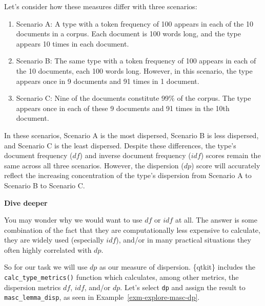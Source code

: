 \documentclass[
  letterpaper,
  krantz1]{latex/krantz-mod}
\providecommand{\tightlist}{%
  \setlength{\itemsep}{0pt}\setlength{\parskip}{0pt}}\usepackage{longtable,booktabs,array}
\theoremstyle{definition}
\theoremstyle{definition}
\theoremstyle{remark}
\begin{document}
\pagebreak

Let's consider how these measures differ with three scenarios:

\begin{enumerate}
\def\labelenumi{\arabic{enumi}.}
\tightlist
\item
  Scenario A: A type with a token frequency of 100 appears in each of
  the 10 documents in a corpus. Each document is 100 words long, and the
  type appears 10 times in each document.
\item
  Scenario B: The same type with a token frequency of 100 appears in
  each of the 10 documents, each 100 words long. However, in this
  scenario, the type appears once in 9 documents and 91 times in 1
  document.
\item
  Scenario C: Nine of the documents constitute 99\% of the corpus. The
  type appears once in each of these 9 documents and 91 times in the
  10th document.
\end{enumerate}

In these scenarios, Scenario A is the most dispersed, Scenario B is less
dispersed, and Scenario C is the least dispersed. Despite these
differences, the type's document frequency (\(df\)) and inverse document
frequency (\(idf\)) scores remain the same across all three scenarios.
However, the dispersion (\(dp\)) score will accurately reflect the
increasing concentration of the type's dispersion from Scenario A to
Scenario B to Scenario C.

\begin{tcolorbox}[enhanced jigsaw, toprule=.15mm, breakable, colback=white, arc=.35mm, left=2mm, colframe=quarto-callout-color-frame, opacityback=0, bottomrule=.15mm, rightrule=.15mm, leftrule=.75mm]

\textbf{ Dive deeper}

You may wonder why we would want to use \(df\) or \(idf\) at all. The
answer is some combination of the fact that they are computationally
less expensive to calculate, they are widely used (especially \(idf\)),
and/or in many practical situations they often highly correlated with
\(dp\).

\end{tcolorbox}

So for our task we will use \(dp\) as our measure of
dispersion. \{qtkit\} includes the
\texttt{calc\_type\_metrics()} function which calculates, among other
metrics, the dispersion metrics \(df\), \(idf\), and/or \(dp\). Let's
select \texttt{dp} and assign the result to \texttt{masc\_lemma\_disp},
as seen in Example~\ref{exm-explore-masc-dp}.
\end{document}
